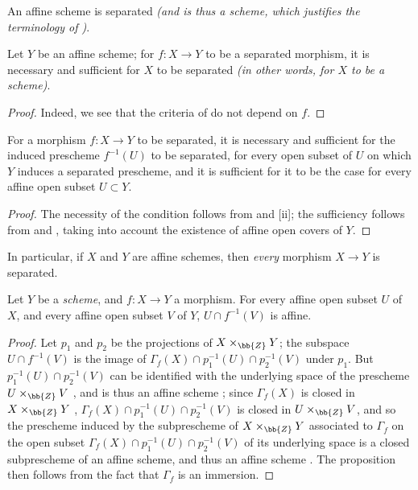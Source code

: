 \begin{corollary}[5.5.7]
\label{I.5.5.7}
An affine scheme is separated \emph{(and is thus a \emph{scheme}, which justifies the terminology of )}.
\end{corollary}

\begin{corollary}[5.5.8]
\label{I.5.5.8}
Let $Y$ be an affine scheme;
for $f:X\to Y$ to be a separated morphism, it is necessary and sufficient for $X$ to be separated \emph{(in other words, for $X$ to be a \emph{scheme})}.
\end{corollary}

\begin{proof}
Indeed, we see that the criteria of  do not depend on $f$.
\end{proof}

\begin{corollary}[5.5.9]
\label{I.5.5.9}
For a morphism $f:X\to Y$ to be separated, it is necessary and sufficient for the induced prescheme $f^{-1}(U)$ to be separated, for every open subset of $U$ on which $Y$ induces a separated prescheme, and it is sufficient for it to be the case for every affine open subset $U\subset Y$.
\end{corollary}

\begin{proof}
The necessity of the condition follows from  and [ii];
the sufficiency follows from  and , taking into account the existence of affine open covers of $Y$.
\end{proof}

In particular, if $X$ and $Y$ are affine schemes, then \emph{every} morphism $X\to Y$ is separated.

\begin{proposition}[5.5.10]
\label{I.5.5.10}
Let $Y$ be a \emph{scheme}, and $f:X\to Y$ a morphism.
For every affine open subset $U$ of $X$, and every affine open subset $V$ of $Y$, $U\cap f^{-1}(V)$ is affine.
\end{proposition}

\begin{proof}
Let $p_1$ and $p_2$ be the projections of $X\times_\bb{Z}Y$;
the subspace $U\cap f^{-1}(V)$ is the image of $\Gamma_f(X)\cap p_1^{-1}(U)\cap p_2^{-1}(V)$ under $p_1$.
But $p_1^{-1}(U)\cap p_2^{-1}(V)$ can be identified with the underlying space of the
prescheme $U\times_\bb{Z}V$ , and is thus an affine scheme ;
since $\Gamma_f(X)$ is closed in $X\times_\bb{Z}Y$ , $\Gamma_f(X)\cap p_1^{-1}(U)\cap p_2^{-1}(V)$ is closed in $U\times_\bb{Z} V$, and so the prescheme induced by the subprescheme of $X\times_\bb{Z}Y$ associated to $\Gamma_f$  on the open subset $\Gamma_f(X)\cap p_1^{-1}(U)\cap p_2^{-1}(V)$ of its underlying space is a closed subprescheme of an affine scheme, and thus an affine scheme .
The proposition then follows from the fact that $\Gamma_f$ is an immersion.
\end{proof}

